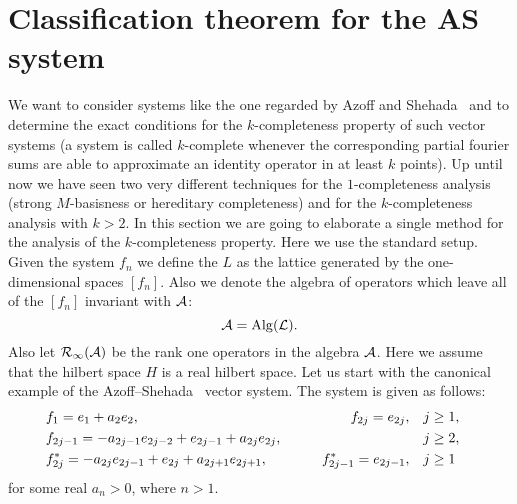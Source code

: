 \section{Classification theorem for the AS system}
  We want to consider systems like the one regarded by Azoff and Shehada~\cite{azoff} and to determine the exact conditions 
    for the $k$-completeness property of such vector systems
    (a system is called $k$-complete whenever the corresponding partial fourier sums are able to approximate an identity operator in at least $k$ points).
  Up until now we have seen two very different techniques for the $1$-completeness analysis (strong $M$-basisness or hereditary completeness) and
    for the $k$-completeness analysis with $k>2$. In this section we are going to elaborate a single method for the analysis of the $k$-completeness property.
  Here we use the standard setup. Given the system $f_n$ we define the $L$ as the lattice generated by the one-dimensional spaces $[f_n]$.
  Also we denote the algebra of operators which leave all of the $[f_n]$ invariant with $\cal{A}$: $$\cal{A} = \operatorname{Alg}(L).$$
  Also let $\cal{R}_1(\cal{A})$ be the rank one operators in the algebra $\cal{A}$. 
  Here we assume that the hilbert space $H$ is a real hilbert space.
  Let us start with the canonical example of the Azoff--Shehada~\cite{azoff} vector system.
  The system is given as follows: 
  \begin{equation} 
    \label{as-system}
      \begin{aligned}
        &f_1 = e_1 + a_2 e_2, \qquad &f_{2j}=e_{2j}, \quad&j \geq 1,&\\
        &f_{2j-1}=-a_{2j-1}e_{2j-2} + e_{2j-1} + a_{2j}e_{2j}, \qquad &\makebox[5em]{} \quad&j \geq 2,&\\
        &f^*_{2j}=-a_{2j}e_{2j-1}+e_{2j}+a_{2j+1}e_{2j+1}, \qquad &f^*_{2j-1}=e_{2j-1}, \quad&j \geq 1&
      \end{aligned}
  \end{equation}
  for some real $a_n > 0$, where $n > 1$.
  
